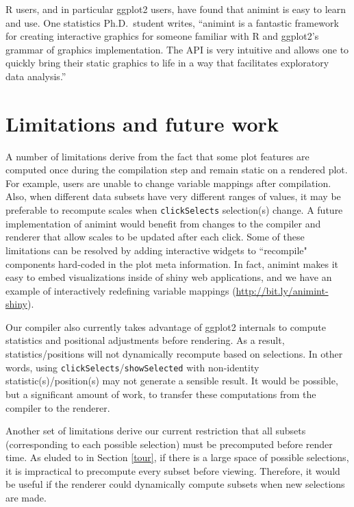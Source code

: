 \documentclass[12pt,]{article}
\theoremstyle{definition}
\theoremstyle{definition}
\theoremstyle{remark}
\begin{document}
R users, and in particular ggplot2 users, have found that animint is
easy to learn and use. One statistics Ph.D.~student writes, ``animint is
a fantastic framework for creating interactive graphics for someone
familiar with R and ggplot2's grammar of graphics implementation. The
API is very intuitive and allows one to quickly bring their static
graphics to life in a way that facilitates exploratory data analysis.''

\section{Limitations and future work}\label{limitations}

A number of limitations derive from the fact that some plot features are
computed once during the compilation step and remain static on a
rendered plot. For example, users are unable to change variable mappings
after compilation. Also, when different data subsets have very different
ranges of values, it may be preferable to recompute scales when
\texttt{clickSelects} selection(s) change. A future implementation of
animint would benefit from changes to the compiler and renderer that
allow scales to be updated after each click. Some of these limitations
can be resolved by adding interactive widgets to ``recompile" components
hard-coded in the plot meta information. In fact, animint makes it easy
to embed visualizations inside of shiny web applications, and we have an
example of interactively redefining variable mappings
(\url{http://bit.ly/animint-shiny}).

Our compiler also currently takes advantage of ggplot2 internals to
compute statistics and positional adjustments before rendering. As a
result, statistics/positions will not dynamically recompute based on
selections. In other words, using
\texttt{clickSelects}/\texttt{showSelected} with non-identity
statistic(s)/position(s) may not generate a sensible result. It would be
possible, but a significant amount of work, to transfer these
computations from the compiler to the renderer.

Another set of limitations derive our current restriction that all
subsets (corresponding to each possible selection) must be precomputed
before render time. As eluded to in Section \ref{tour}, if there is a
large space of possible selections, it is impractical to precompute
every subset before viewing. Therefore, it would be useful if the
renderer could dynamically compute subsets when new selections are made.
\end{document}

